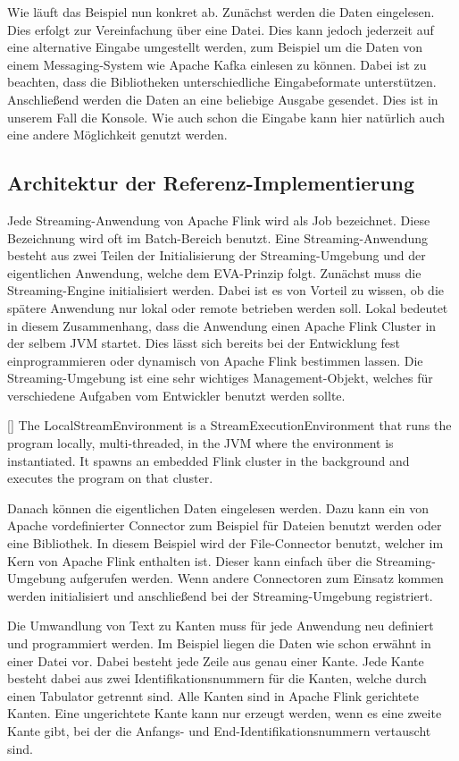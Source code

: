 Wie läuft das Beispiel nun konkret ab. Zunächst werden die Daten eingelesen. Dies
erfolgt zur Vereinfachung über eine Datei. Dies kann jedoch jederzeit auf eine
alternative Eingabe umgestellt werden, zum Beispiel um die Daten von einem
Messaging-System wie Apache Kafka einlesen zu können. Dabei ist zu beachten,
dass die Bibliotheken unterschiedliche Eingabeformate unterstützen. Anschließend
werden die Daten an eine beliebige Ausgabe gesendet. Dies ist in unserem Fall die
Konsole. Wie auch schon die Eingabe kann hier natürlich auch eine andere Möglichkeit
genutzt werden.

\subsection{Architektur der Referenz-Implementierung}
Jede Streaming-Anwendung von Apache Flink wird als Job bezeichnet. Diese
Bezeichnung wird oft im Batch-Bereich benutzt. Eine Streaming-Anwendung besteht
aus zwei Teilen der Initialisierung der Streaming-Umgebung und der eigentlichen
Anwendung, welche dem EVA-Prinzip folgt. Zunächst muss die Streaming-Engine
initialisiert werden. Dabei ist es von Vorteil zu wissen, ob die spätere Anwendung
nur lokal oder remote betrieben werden soll. Lokal bedeutet in diesem Zusammenhang,
dass die Anwendung einen Apache Flink Cluster in der selbem \gls{JVM} startet.
Dies lässt sich bereits bei der Entwicklung fest einprogrammieren oder dynamisch
von Apache Flink bestimmen lassen. Die Streaming-Umgebung ist eine sehr wichtiges
Management-Objekt, welches für verschiedene Aufgaben vom Entwickler benutzt
werden sollte.

[\cite{Foundation2018}]{
The LocalStreamEnvironment is a StreamExecutionEnvironment that runs the program
locally, multi-threaded, in the JVM where the environment is instantiated. It
spawns an embedded Flink cluster in the background and executes the program on
that cluster.}

Danach können die eigentlichen Daten eingelesen werden. Dazu kann ein von Apache
vordefinierter Connector zum Beispiel für Dateien benutzt werden oder eine
Bibliothek. In diesem Beispiel wird der File-Connector benutzt, welcher im Kern
von Apache Flink enthalten ist. Dieser kann einfach über die Streaming-Umgebung
aufgerufen werden. Wenn andere Connectoren zum Einsatz kommen werden initialisiert
und anschließend bei der Streaming-Umgebung registriert.

Die Umwandlung von Text zu Kanten muss für jede Anwendung neu definiert und
programmiert werden. Im Beispiel liegen die Daten wie schon erwähnt in einer
Datei vor. Dabei besteht jede Zeile aus genau einer Kante. Jede Kante besteht
dabei aus zwei Identifikationsnummern für die Kanten, welche durch einen
Tabulator getrennt sind. Alle Kanten sind in Apache Flink gerichtete Kanten.
Eine ungerichtete Kante kann nur erzeugt werden, wenn es eine zweite Kante gibt,
bei der die Anfangs- und End-Identifikationsnummern vertauscht sind.

